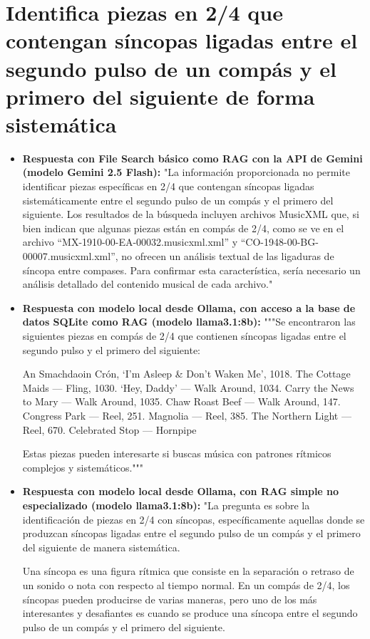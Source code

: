 \section{Identifica piezas en 2/4 que contengan síncopas ligadas entre el segundo pulso de un compás y el primero del siguiente de forma sistemática}
\begin{itemize}
    \item \textbf{Respuesta con File Search básico como RAG con la API de Gemini (modelo Gemini 2.5 Flash):} "La información proporcionada no permite identificar piezas específicas en 2/4 que contengan síncopas ligadas sistemáticamente entre el segundo pulso de un compás y el primero del siguiente. Los resultados de la búsqueda incluyen archivos MusicXML que, si bien indican que algunas piezas están en compás de 2/4, como se ve en el archivo ``MX-1910-00-EA-00032.musicxml.xml'' y ``CO-1948-00-BG-00007.musicxml.xml'', no ofrecen un análisis textual de las ligaduras de síncopa entre compases. Para confirmar esta característica, sería necesario un análisis detallado del contenido musical de cada archivo."
    \item \textbf{Respuesta con modelo local desde Ollama, con acceso a la base de datos SQLite como RAG (modelo llama3.1:8b):} """Se encontraron las siguientes piezas en compás de 2/4 que contienen síncopas ligadas entre el segundo pulso y el primero del siguiente: 

An Smachdaoin Crón,
‘I’m Asleep \& Don’t Waken Me’,
1018. The Cottage Maids — Fling,
1030. ‘Hey, Daddy’ — Walk Around,
1034. Carry the News to Mary — Walk Around,
1035. Chaw Roast Beef — Walk Around,
147. Congress Park — Reel,
251. Magnolia — Reel,
385. The Northern Light — Reel,
670. Celebrated Stop — Hornpipe

Estas piezas pueden interesarte si buscas música con patrones rítmicos complejos y sistemáticos."""
\item \textbf{Respuesta con modelo local desde Ollama, con RAG simple no especializado (modelo llama3.1:8b):} "La pregunta es sobre la identificación de piezas en 2/4 con síncopas, específicamente aquellas donde se produzcan síncopas ligadas entre el segundo pulso de un compás y el primero del siguiente de manera sistemática.

Una síncopa es una figura rítmica que consiste en la separación o retraso de un sonido o nota con respecto al tiempo normal. En un compás de 2/4, los síncopas pueden producirse de varias maneras, pero uno de los más interesantes y desafiantes es cuando se produce una síncopa entre el segundo pulso de un compás y el primero del siguiente.


\end{itemize}
